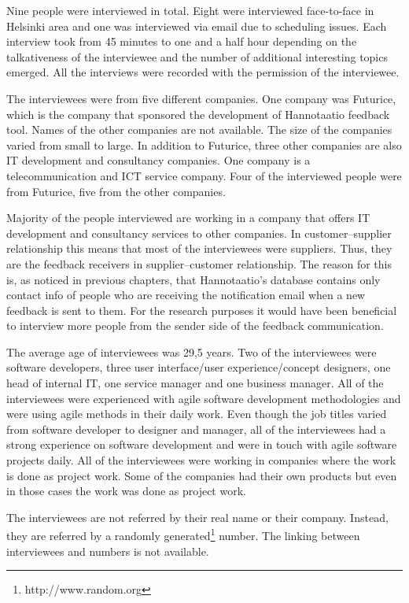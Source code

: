 \documentclass[english,12pt,a4paper,pdftex]{article}
\begin{document}
Nine people were interviewed in total. Eight were interviewed face-to-face in Helsinki area and one was interviewed  via email due to scheduling issues. Each interview took from 45 minutes to one and a half hour depending on the talkativeness of the interviewee and the number of additional interesting topics emerged. All the interviews were recorded with the permission of the interviewee. 

The interviewees were from five different companies. One company was Futurice, which is the company that sponsored the development of Hannotaatio feedback tool. Names of the other companies are not available. The size of the companies varied from small to large. In addition to Futurice, three other companies are also IT development and consultancy companies. One company is a telecommunication and ICT service company. Four of the interviewed people were from Futurice, five from the other companies.

Majority of the people interviewed are working in a company that offers IT development and consultancy services to other companies. In customer--supplier relationship this means that most of the interviewees were suppliers. Thus, they are the feedback receivers in supplier--customer relationship. The reason for this is, as noticed in previous chapters, that Hannotaatio's database contains only contact info of people who are receiving the notification email when a new feedback is sent to them. For the research purposes it would have been beneficial to interview more people from the sender side of the feedback communication.

The average age of interviewees was 29,5 years. Two of the interviewees were software developers, three user interface/user experience/concept designers, one head of internal IT, one service manager and one business manager. All of the interviewees were experienced with agile software development methodologies and were using agile methods in their daily work. Even though the job titles varied from software developer to designer and manager, all of the interviewees had a strong experience on software development and were in touch with agile software projects daily. All of the interviewees were working in companies where the work is done as project work. Some of the companies had their own products but even in those cases the work was done as project work.

The interviewees are not referred by their real name or their company. Instead, they are referred by a randomly generated\footnote{http://www.random.org} number. The linking between interviewees and numbers is not available.
\end{document}
